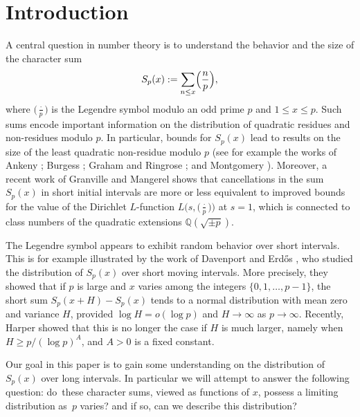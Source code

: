 \documentclass[JEP,XML,SOM,Unicode,NoFloatCountersInSection,published]{cedram}
\theoremstyle{plain}
\theoremstyle{definition}
\newcommand{\Legendre}[2]{\Bigl(\dfrac{#1}{#2}\Bigr)}
\begin{document}
\maketitle
\vspace*{-1.2\baselineskip}
\tableofcontents


\vspace*{-2.2\baselineskip}\vskip0pt
\section{Introduction}\label{s: introduction_real_characters}

A central question in number theory is to understand the behavior and the size of the character sum\vspace*{-3pt}
\begin{equation}\label{eq: definition of character sum}
S_p(x) := \sum_{n \leq x} \Legendre{n}{p},
\end{equation}
where $\bigl(\frac{\cdot}{p}\bigr)$ is the Legendre symbol modulo an odd prime $p$ and $1\leq x\leq p$.
Such sums encode important
information on the distribution of quadratic residues and non-residues modulo $p$. In particular, bounds for $S_p(x)$ lead to results on the size of the least quadratic non-residue
modulo $p$ (see for example the works of Ankeny \cite{An};
Burgess \cite{Bu}; Graham and Ringrose \cite{GrRi}; and Montgomery
\cite{Mo}). Moreover, a recent work of Granville and Mangerel \cite{GrMa} shows that cancellations in the sum $S_p(x)$ in short initial intervals are more or less equivalent to improved bounds for the value of the Dirichlet $L$-function $L\big(s, \big(\frac{\cdot}{p}\big)\big)$ at $s=1$, which is connected to class numbers of the quadratic extensions $\mathbb{Q}(\sqrt{\pm p})$.

The Legendre symbol appears to exhibit random behavior over short intervals. This is for example illustrated by the work of Davenport and Erd\H{o}s \cite{DaEr}, who studied the distribution of $S_p(x)$ over short moving intervals. More precisely, they showed that if $p$ is large and $x$ varies among the integers $\{0, 1, \dots, p-1\}$, the short sum $S_p(x+H)-S_p(x)$ tends to a normal distribution with mean zero and variance $H$, provided $\log H = o(\log p)$ and $H \rightarrow \infty$ as $p \rightarrow \infty$. Recently, Harper \cite{Ha3} showed that this is no longer the case if $H$ is much larger, namely when $H\geq p/(\log p)^A$, and $A>0$ is a fixed constant.

Our goal in this paper is to gain some understanding on the distribution of $S_p(x)$ over long intervals. In particular we will attempt to answer the following question: do~these character sums, viewed as functions of $x$, possess a limiting distribution as~$p$ varies? and if so, can we describe this distribution?
\end{document}
